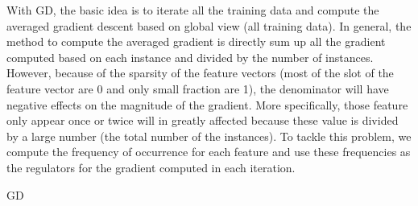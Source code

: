 \documentclass[sigconf]{acmart}
\makeatletter
\def\BState{\State\hskip-\ALG@thistlm}
\makeatother
\begin{document}
With GD, the basic idea is to iterate all the training data and compute the averaged gradient descent based on global view (all training data). In general, the method to compute the averaged gradient is directly sum up all the gradient computed based on each instance and divided by the number of instances. However, because of the sparsity of the feature vectors (most of the slot of the feature vector are 0 and only small fraction are 1), the denominator will have negative effects on the magnitude of the gradient. More specifically, those feature only appear once or twice will in greatly affected because these value is divided by a large number (the total number of the instances). To tackle this problem, we compute the frequency of occurrence for each feature and use these frequencies as the regulators for the gradient computed in each iteration.
\begin{algorithm}
\caption{GD}\label{GD}
\end{algorithm}
\end{document}
